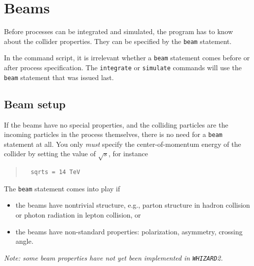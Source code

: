 \documentclass[12pt]{book}
\newcommand{\ttt}[1]{\texttt{#1}}
\newcommand{\whizard}{\texttt{WHIZARD}}
\begin{document}



\section{Beams}
\label{sec:beams}

Before processes can be integrated and simulated, the program has to know
about the collider properties.  They can be specified by the \ttt{beam}
statement.

In the command script, it is irrelevant whether a \ttt{beam} statement comes
before or after process specification.  The \ttt{integrate} or \ttt{simulate}
commands will use the \ttt{beam} statement that was issued last.


\subsection{Beam setup}
\label{sec:beam-setup}

If the beams have no special properties, and the colliding particles are the
incoming particles in the process themselves, there is no need for a
\ttt{beam} statement at all.  You only \emph{must} specify the
center-of-momentum energy of the collider by setting the value of $\sqrt{s}$,
for instance
\begin{quote}
\begin{footnotesize}
\begin{verbatim}
  sqrts = 14 TeV
\end{verbatim}
\end{footnotesize}
\end{quote}
The \ttt{beam} statement comes into play if
\begin{itemize}
\item
  the beams have nontrivial structure, e.g., parton structure in hadron
  collision or photon radiation in lepton collision, or
\item
  the beams have non-standard properties: polarization, asymmetry, crossing
  angle. 
\end{itemize}
\emph{Note: some beam properties have not yet been implemented in \whizard 2.}
\end{document}
